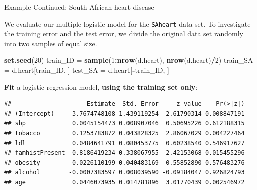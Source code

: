 \documentclass[10pt,ignorenonframetext,]{beamer}
\newenvironment{Shaded}{\begin{snugshade}}{\end{snugshade}}
\newcommand{\KeywordTok}[1]{\textcolor[rgb]{0.13,0.29,0.53}{\textbf{#1}}}
\newcommand{\DataTypeTok}[1]{\textcolor[rgb]{0.13,0.29,0.53}{#1}}
\newcommand{\DecValTok}[1]{\textcolor[rgb]{0.00,0.00,0.81}{#1}}
\newcommand{\StringTok}[1]{\textcolor[rgb]{0.31,0.60,0.02}{#1}}
\newcommand{\OperatorTok}[1]{\textcolor[rgb]{0.81,0.36,0.00}{\textbf{#1}}}
\newcommand{\NormalTok}[1]{#1}
\begin{document}
\begin{frame}[fragile]

\begin{block}{Example Continued: South African heart disease}

\vspace{2mm}

We evaluate our multiple logistic model for the \texttt{SAheart} data
set. To investigate the training error and the test error, we divide the
original data set randomly into two samples of equal size.

\scriptsize

\begin{Shaded}
\begin{Highlighting}[]
\KeywordTok{set.seed}\NormalTok{(}\DecValTok{20}\NormalTok{)}
\NormalTok{train_ID =}\StringTok{ }\KeywordTok{sample}\NormalTok{(}\DecValTok{1}\OperatorTok{:}\KeywordTok{nrow}\NormalTok{(d.heart), }\KeywordTok{nrow}\NormalTok{(d.heart)}\OperatorTok{/}\DecValTok{2}\NormalTok{)}
\NormalTok{train_SA =}\StringTok{ }\NormalTok{d.heart[train_ID, ]}
\NormalTok{test_SA =}\StringTok{ }\NormalTok{d.heart[}\OperatorTok{-}\NormalTok{train_ID, ]}
\end{Highlighting}
\end{Shaded}

\normalsize

\textbf{Fit} a logistic regression model, \textbf{using the training set
only}:

\scriptsize

\begin{Shaded}
\end{Shaded}

\begin{verbatim}
##                     Estimate  Std. Error     z value    Pr(>|z|)
## (Intercept)    -3.7674748108 1.439119254 -2.61790314 0.008847191
## sbp             0.0045154473 0.008907046  0.50695226 0.612188315
## tobacco         0.1253783872 0.043828325  2.86067029 0.004227464
## ldl             0.0484641791 0.080453775  0.60238540 0.546917627
## famhistPresent  0.8186419234 0.338067955  2.42153068 0.015455296
## obesity        -0.0226110199 0.040483169 -0.55852890 0.576483276
## alcohol        -0.0007383597 0.008039590 -0.09184047 0.926824793
## age             0.0446073935 0.014781896  3.01770439 0.002546972
\end{verbatim}

\end{block}

\end{frame}
\end{document}
